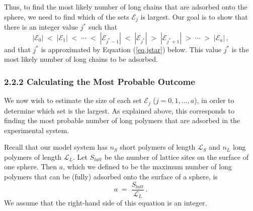 \documentclass[journal=mamobx,manuscript=article]{achemso}
\newcommand{\leng}{\mathcal{L}}
\begin{document}
Thus, to find the most likely number of long chains %
that are adsorbed onto the sphere, we need to 
find which of the sets $\mathcal{E}_j$ is largest.
Our goal is to show that there is an integer value $j^*$
such that
\begin{equation}
    \label{eq.EEcomp}
  |\mathcal{E}_0| \;<\; |\mathcal{E}_1|\; < \; 
 \cdots\; < \; 
  |\mathcal{E}_{j^*-1}|\; < \;|\mathcal{E}_{j^*}|\; >
    \; |\mathcal{E}_{j^*+1}| \;>\; \cdots \; > \; |\mathcal{E}_a|\,,
\end{equation}
and that $j^*$ is approximated by Equation (\ref{eq.jstar}) below.  
This value $j^*$ is the most likely
number of long chains to be adsorbed.

\subsubsection{2.2.2 Calculating the Most Probable Outcome}   %
    \label{sec-calcMPO}

We now wish to estimate the size of each set $\mathcal{E}_j$ ($j=0,1,\ldots,a$), in order to  determine which set is the largest.  
As explained above, this corresponds to finding the most probable number of 
long polymers that are adsorbed in the experimental system. 

Recall that our model system has $n_S$ short 
polymers of length $\leng_S$ and $n_L$ long polymers
of length $\leng_L$.  
Let $S_{latt}$ be the number of lattice sites on 
the surface of one sphere.  Then $a$, which we
defined to be the maximum
number of long polymers that can be (fully)
adsorbed onto the surface of a sphere, is 
\begin{equation}
  \label{eq.aequal}
     a  \;=\;  \frac{S_{latt}}{\leng_L} \,.
\end{equation}
We assume that the right-hand side of this equation is an integer.  
\end{document}
